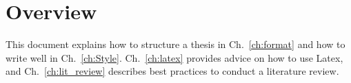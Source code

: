 \section{Overview}
This document explains how to structure a thesis in Ch.~\ref{ch:format} and how to write well in Ch.~\ref{ch:Style}.
Ch.~\ref{ch:latex} provides advice on how to use Latex, and Ch.~\ref{ch:lit_review} describes best practices to conduct a literature review.

